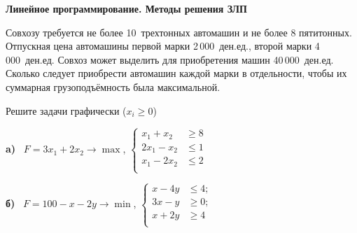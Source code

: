 \documentclass[a5paper,11pt]{extarticle}
\begin{document}
\begin{enumerate}
  {\item[]
          \bfseries Линейное программирование. Методы решения ЗЛП
          \par\vspace{1mm}
  }

%

\item Совхозу требуется не более 10~трехтонных автомашин и не более 8 пятитонных.
Отпускная цена автомашины первой марки 2\,000~ден.\;ед., второй марки 4\,000~ден.\;ед.
Совхоз может выделить для приобретения машин 40\,000~ден.\;ед. Сколько следует
приобрести автомашин каждой марки в отдельности, чтобы их суммарная
грузоподъёмность была максимальной.

\item Решите задачи графически ($x_{i} \geqslant 0$)

\textbf{a)}~%
$F=3x_{1}+2x_{2} \to \max$,\quad 
$\left\lbrace
  \begin{aligned}
    x_{1}+x_{2} &\geqslant 8\\
    2x_{1}-x_{2} &\leqslant 1\\
    x_{1}-2x_2 &\leqslant 2\\
  \end{aligned} 
  \right.$ 

\textbf{б)}~%
	$F=100-x-2y \to \min$, \quad
	$ \left\lbrace\begin{aligned}
		x - 4y &\leqslant 4;\\
		3x - y &\geqslant 0;\\
		x + 2y  &\geqslant 4\\
	  \end{aligned} \right.
	$


\end{enumerate}
\end{document}
